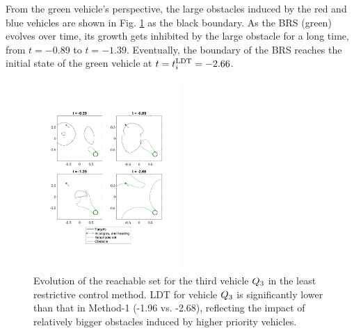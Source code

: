 From the green vehicle's perspective, the large obstacles induced by the red and blue vehicles are shown in Fig. \ref{fig:lrc_rs3} as the black boundary. As the BRS (green) evolves over time, its growth gets inhibited by the large obstacle for a long time, from $t=-0.89$ to $t=-1.39$. Eventually, the boundary of the BRS reaches the initial state of the green vehicle at $t = t^\text{LDT}_i = -2.66$.

\begin{figure}
  \centering
  \includegraphics[width=0.5\textwidth]{"fig/lrc_rs3"}
  \caption{Evolution of the reachable set for the third vehicle $Q_3$ in the least restrictive control method. LDT for vehicle $Q_3$ is significantly lower than that in Method-1 (-1.96 vs. -2.68), reflecting the impact of relatively bigger obstacles induced by higher priority vehicles. }
  \label{fig:lrc_rs3}
\end{figure}
